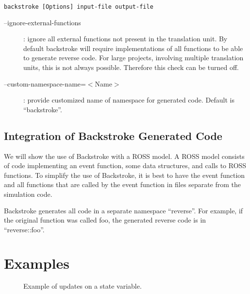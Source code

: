 \documentclass[english,12pt, titlepage]{article}      %
\begin{document}
\verb+backstroke [Options] input-file output-file+

\begin{description}
\item [--ignore-external-functions]: ignore all external functions not present in the translation unit. By default backstroke will require implementations of all functions to be able to generate reverse code. For large projects, involving multiple translation units, this is not always possible. Therefore this check can be turned off.
\item [--custom-namespace-name=$<$Name$>$]: provide customized name of namespace for generated code. Default is ``backstroke''.
\end{description}

\subsection{Integration of Backstroke Generated Code}

We will show the use of Backstroke with a ROSS model. A ROSS model
consists of code implementing an event function, some data structures,
and calls to ROSS functions. To simplify the use of Backstroke, it is
best to have the event function and all functions that are called by
the event function in files separate from the simulation code.

Backstroke generates all code in a separate namespace ``reverse''. For
example, if the original function was called foo, the generated
reverse code is in ``reverse::foo''.

\section{Examples}

\begin{figure}[h!]
\begin{boxedverbatim}
        void event(State* state) {           
          if(state->x > 20) {
            state -> x = 0;
          } else {
            state->++x;
          }                  
\end{boxedverbatim}
\caption{Example of updates on a state variable.}\label{exampleprogram1}
\end{figure}

%
% 
\end{document}
